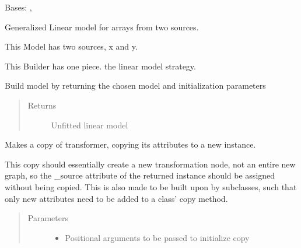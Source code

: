 \documentclass[letterpaper,10pt,english]{sphinxmanual}
\begin{document}
\begin{fulllineitems}
\label{\detokenize{dalio.model:dalio.model.statistical.XYLinearModel}}
Bases: {\hyperref[\detokenize{dalio.model:dalio.model.model.Model}]{}}, 

Generalized Linear model for arrays from two sources.

This Model has two sources, x and y.

This Builder has one piece. the linear model strategy.

\begin{fulllineitems}
\label{\detokenize{dalio.model:dalio.model.statistical.XYLinearModel.build_model}}
Build model by returning the chosen model and initialization
parameters
\begin{quote}\begin{description}
\item[{Returns}] \leavevmode
Unfitted linear model

\end{description}\end{quote}

\end{fulllineitems}


\begin{fulllineitems}
\label{\detokenize{dalio.model:dalio.model.statistical.XYLinearModel.copy}}
Makes a copy of transformer, copying its attributes to a new
instance.

This copy should essentially create a new transformation node, not an
entire new graph, so the \_source attribute of the returned instance
should be assigned without being copied. This is also made to be built
upon by subclasses, such that only new attributes need to be added to
a class’ copy method.
\begin{quote}\begin{description}
\item[{Parameters}] \leavevmode\begin{itemize}
\item {} 
 \textendash{} Positional arguments to be passed to initialize copy


\end{itemize}
\end{description}
\end{quote}
\end{fulllineitems}
\end{fulllineitems}
\end{document}

